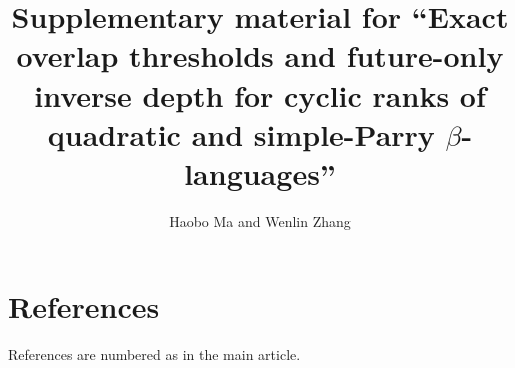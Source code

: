 \documentclass[12pt,a4paper]{article}
\title{Supplementary material for ``Exact overlap thresholds and future-only
inverse depth for cyclic ranks of quadratic and simple-Parry
$\beta$-languages''}
\author{Haobo Ma and Wenlin Zhang}
\date{}
\theoremstyle{definition}
\theoremstyle{plain}
\theoremstyle{remark}
\numberwithin{equation}{section}
\begin{document}
\maketitle
\appendix







\section*{References}
References are numbered as in the main article.
\end{document}
